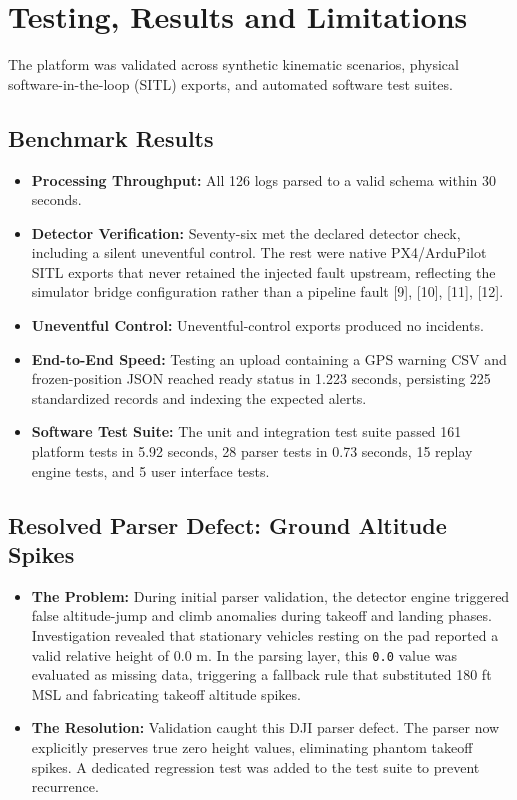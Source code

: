 \documentclass[11pt,a4paper]{article}
\newcommand{\code}[1]{\colorbox{codebg}{\small\texttt{\color{darkslate}#1}}}
\begin{document}
\clearpage

\section{Testing, Results and Limitations}

The platform was validated across synthetic kinematic scenarios, physical software-in-the-loop (SITL) exports, and automated software test suites.

\subsection{Benchmark Results}
\begin{itemize}
    \item \textbf{\color{accent}Processing Throughput:} All 126 logs parsed to a valid schema within 30 seconds.
    \item \textbf{\color{accent}Detector Verification:} Seventy-six met the declared detector check, including a silent uneventful control. The rest were native PX4/ArduPilot SITL exports that never retained the injected fault upstream, reflecting the simulator bridge configuration rather than a pipeline fault [9], [10], [11], [12].
    \item \textbf{\color{accent}Uneventful Control:} Uneventful-control exports produced no incidents.
    \item \textbf{\color{accent}End-to-End Speed:} Testing an upload containing a GPS warning CSV and frozen-position JSON reached ready status in 1.223 seconds, persisting 225 standardized records and indexing the expected alerts.
    \item \textbf{\color{accent}Software Test Suite:} The unit and integration test suite passed 161 platform tests in 5.92 seconds, 28 parser tests in 0.73 seconds, 15 replay engine tests, and 5 user interface tests.
\end{itemize}

\subsection{Resolved Parser Defect: Ground Altitude Spikes}
\begin{itemize}
    \item \textbf{The Problem:} During initial parser validation, the detector engine triggered false altitude-jump and climb anomalies during takeoff and landing phases. Investigation revealed that stationary vehicles resting on the pad reported a valid relative height of 0.0 m. In the parsing layer, this \code{0.0} value was evaluated as missing data, triggering a fallback rule that substituted 180 ft MSL and fabricating takeoff altitude spikes.
    \item \textbf{The Resolution:} Validation caught this DJI parser defect. The parser now explicitly preserves true zero height values, eliminating phantom takeoff spikes. A dedicated regression test was added to the test suite to prevent recurrence.
\end{itemize}
\end{document}
